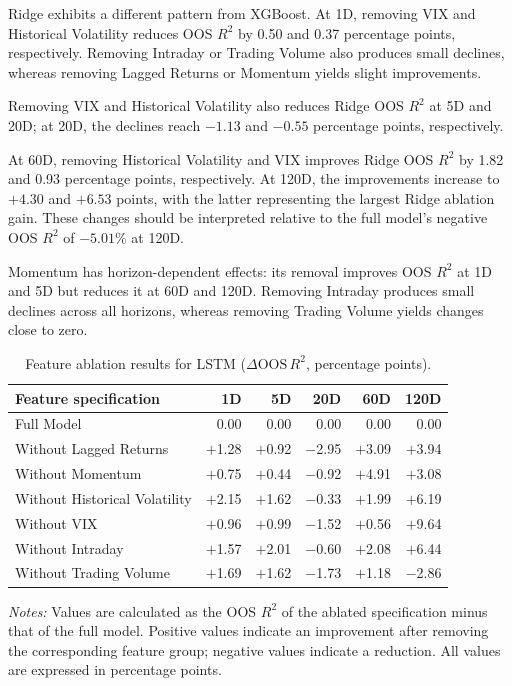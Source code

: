 \documentclass[runningheads,orivec]{llncs}
\begin{document}
Ridge exhibits a different pattern from XGBoost. At 1D, removing VIX and Historical Volatility reduces OOS $R^2$ by 0.50 and 0.37 percentage points, respectively. Removing Intraday or Trading Volume also produces small declines, whereas removing Lagged Returns or Momentum yields slight improvements.

Removing VIX and Historical Volatility also reduces Ridge OOS $R^2$ at 5D and 20D; at 20D, the declines reach $-1.13$ and $-0.55$ percentage points, respectively.

At 60D, removing Historical Volatility and VIX improves Ridge OOS $R^2$ by 1.82 and 0.93 percentage points, respectively. At 120D, the improvements increase to $+4.30$ and $+6.53$ points, with the latter representing the largest Ridge ablation gain. These changes should be interpreted relative to the full model's negative OOS $R^2$ of $-5.01\%$ at 120D.

Momentum has horizon-dependent effects: its removal improves OOS $R^2$ at 1D and 5D but reduces it at 60D and 120D. Removing Intraday produces small declines across all horizons, whereas removing Trading Volume yields changes close to zero.

\begin{table}[htbp]
\centering
\caption{Feature ablation results for LSTM ($\Delta \mathrm{OOS}\,R^2$, percentage points).}\label{tab:ablation_lstm}
{\footnotesize
\setlength{\tabcolsep}{6pt}
\begin{tabular}{lrrrrr}
\hline
Feature specification & 1D & 5D & 20D & 60D & 120D \\
\hline
Full Model & 0.00 & 0.00 & 0.00 & 0.00 & 0.00 \\
Without Lagged Returns & $+$1.28 & $+$0.92 & $-$2.95 & $+$3.09 & $+$3.94 \\
Without Momentum & $+$0.75 & $+$0.44 & $-$0.92 & $+$4.91 & $+$3.08 \\
Without Historical Volatility & $+$2.15 & $+$1.62 & $-$0.33 & $+$1.99 & $+$6.19 \\
Without VIX & $+$0.96 & $+$0.99 & $-$1.52 & $+$0.56 & $+$9.64 \\
Without Intraday & $+$1.57 & $+$2.01 & $-$0.60 & $+$2.08 & $+$6.44 \\
Without Trading Volume & $+$1.69 & $+$1.62 & $-$1.73 & $+$1.18 & $-$2.86 \\
\hline
\end{tabular}
}
\par\vspace{4pt}\parbox{\linewidth}{\scriptsize\textit{Notes:} Values are calculated as the OOS $R^2$ of the ablated specification minus that of the full model. Positive values indicate an improvement after removing the corresponding feature group; negative values indicate a reduction. All values are expressed in percentage points.}
\end{table}
\end{document}
